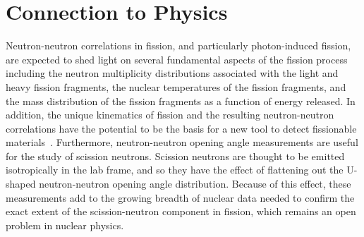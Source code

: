 \section{Connection to Physics}
Neutron-neutron correlations in fission, and particularly photon-induced fission, are expected to shed light on several fundamental aspects of the fission process including the neutron multiplicity distributions associated with the light and heavy fission fragments, the nuclear temperatures of the fission fragments, and the mass distribution of the fission fragments as a function of energy released.
In addition, the unique kinematics of fission and the resulting neutron-neutron correlations have the potential to be the basis for a new tool to detect fissionable materials~\cite{Talou2018}.
Furthermore, neutron-neutron opening angle measurements are useful for the study of scission neutrons.
Scission neutrons are thought to be emitted isotropically in the lab frame, and so they have the effect of flattening out the U-shaped neutron-neutron opening angle distribution.
Because of this effect, these measurements add to the growing breadth of nuclear data needed to confirm the exact extent of the scission-neutron component in fission, which remains an open problem in nuclear physics.

